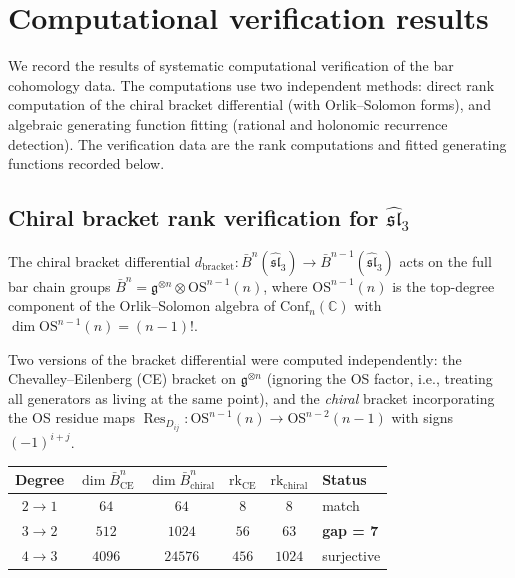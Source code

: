 \section{Computational verification results}
\label{sec:computational-verification}

We record the results of systematic computational verification of the bar
cohomology data. The computations use two independent methods: direct rank
computation of the chiral bracket differential (with Orlik--Solomon forms),
and algebraic generating function fitting (rational and holonomic recurrence
detection). The verification data are the rank computations and fitted
generating functions recorded below.

\subsection{Chiral bracket rank verification for $\widehat{\mathfrak{sl}}_3$}
\label{subsec:chiral-bracket-verification}

The chiral bracket differential
$d_{\mathrm{bracket}}\colon \bar{B}^n(\widehat{\mathfrak{sl}}_3) \to
\bar{B}^{n-1}(\widehat{\mathfrak{sl}}_3)$
acts on the full bar chain groups
$\bar{B}^n = \mathfrak{g}^{\otimes n} \otimes \mathrm{OS}^{n-1}(n)$,
where $\mathrm{OS}^{n-1}(n)$ is the top-degree component of the
Orlik--Solomon algebra of $\mathrm{Conf}_n(\mathbb{C})$
with $\dim\mathrm{OS}^{n-1}(n) = (n-1)!$.

Two versions of the bracket differential were computed independently:
the Chevalley--Eilenberg (CE) bracket on $\mathfrak{g}^{\otimes n}$
(ignoring the OS factor, i.e., treating all generators as living at the
same point), and the \emph{chiral} bracket incorporating the OS
residue maps $\operatorname{Res}_{D_{ij}}\colon
\mathrm{OS}^{n-1}(n) \to \mathrm{OS}^{n-2}(n-1)$
with signs $(-1)^{i+j}$.

\begin{center}
\renewcommand{\arraystretch}{1.3}
\begin{tabular}{c|cc|cc|l}
\toprule
\textbf{Degree} & $\dim \bar{B}^n_{\mathrm{CE}}$ &
 $\dim \bar{B}^n_{\mathrm{chiral}}$ &
 $\mathrm{rk}_{\mathrm{CE}}$ & $\mathrm{rk}_{\mathrm{chiral}}$ &
 \textbf{Status} \\
\midrule
$2 \to 1$ & $64$ & $64$ & $8$ & $8$ & match \\
$3 \to 2$ & $512$ & $1024$ & $56$ & $63$ & \textbf{gap = 7} \\
$4 \to 3$ & $4096$ & $24576$ & $456$ & $1024$ & surjective \\
\bottomrule
\end{tabular}
\end{center}

